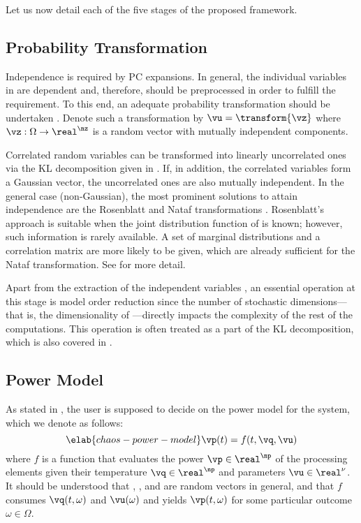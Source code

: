 Let us now detail each of the five stages of the proposed framework.

\subsection{Probability Transformation}

Independence is required by \ac{PC} expansions. In general, the \nu individual
variables in \vu are dependent and, therefore, should be preprocessed in order
to fulfill the requirement. To this end, an adequate probability transformation
should be undertaken \cite{eldred2008}. Denote such a transformation by $\vu =
\transform{\vz}$ where $\vz: \Omega \to \real^\nz$ is a random vector with \nz
mutually independent components.

Correlated random variables can be transformed into linearly uncorrelated ones
via the \ac{KL} decomposition given in . If, in addition,
the correlated variables form a Gaussian vector, the uncorrelated ones are also
mutually independent. In the general case (non-Gaussian), the most prominent
solutions to attain independence are the Rosenblatt \cite{rosenblatt1952} and
Nataf transformations \cite{liu1986}. Rosenblatt's approach is suitable when the
joint distribution function of \vu is known; however, such information is rarely
available. A set of marginal distributions and a correlation matrix are more
likely to be given, which are already sufficient for the Nataf transformation.
See  for more detail.

Apart from the extraction of the independent variables \vz, an essential
operation at this stage is model order reduction since the number of stochastic
dimensions---that is, the dimensionality of \vz---directly impacts the
complexity of the rest of the computations. This operation is often treated as a
part of the \ac{KL} decomposition, which is also covered in
.

\subsection{Power Model}

As stated in , the user is supposed to decide on the power
model for the system, which we denote as follows:
\begin{equation} \elab{chaos-power-model}
  \vp(t) = f(t, \vq, \vu)
\end{equation}
where $f$ is a function that evaluates the power $\vp \in \real^\np$ of the
processing elements given their temperature $\vq \in \real^\np$ and parameters
$\vu \in \real^\nu$. It should be understood that \vp, \vq, and \vu are random
vectors in general, and that $f$ consumes $\vq(t, \omega)$ and $\vu(\omega)$ and
yields $\vp(t, \omega)$ for some particular outcome $\omega \in \Omega$.

